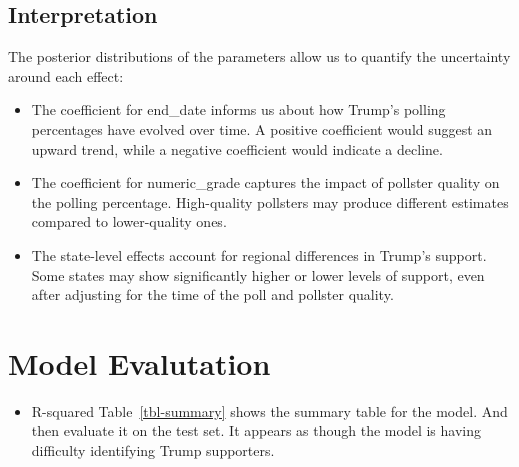 \documentclass[
  letterpaper,
  DIV=11,
  numbers=noendperiod]{scrartcl}
\providecommand{\tightlist}{%
  \setlength{\itemsep}{0pt}\setlength{\parskip}{0pt}}\usepackage{longtable,booktabs,array}
\begin{document}
\subsection{Interpretation}\label{interpretation}

The posterior distributions of the parameters allow us to quantify the
uncertainty around each effect:\\

\begin{itemize}
\tightlist
\item
  The coefficient for end\_date informs us about how Trump's polling
  percentages have evolved over time. A positive coefficient would
  suggest an upward trend, while a negative coefficient would indicate a
  decline.\\
\item
  The coefficient for numeric\_grade captures the impact of pollster
  quality on the polling percentage. High-quality pollsters may produce
  different estimates compared to lower-quality ones.\\
\item
  The state-level effects account for regional differences in Trump's
  support. Some states may show significantly higher or lower levels of
  support, even after adjusting for the time of the poll and pollster
  quality.
\end{itemize}

\section{Model Evalutation}\label{model-evalutation}

\begin{itemize}
\tightlist
\item
  R-squared Table~\ref{tbl-summary} shows the summary table for the
  model. And then evaluate it on the test set. It appears as though the
  model is having difficulty identifying Trump supporters.
\end{itemize}
\end{document}
